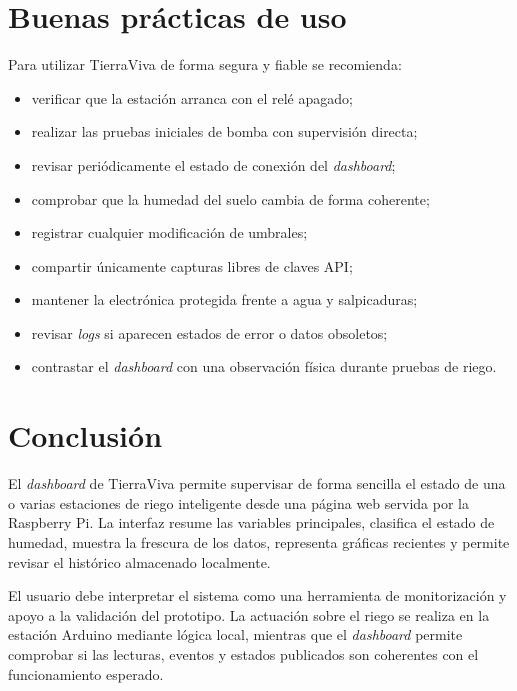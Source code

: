 \section{Buenas prácticas de uso}

Para utilizar TierraViva de forma segura y fiable se recomienda:

\begin{itemize}
    \item verificar que la estación arranca con el relé apagado;
    \item realizar las pruebas iniciales de bomba con supervisión directa;
    \item revisar periódicamente el estado de conexión del \textit{dashboard};
    \item comprobar que la humedad del suelo cambia de forma coherente;
    \item registrar cualquier modificación de umbrales;
    \item compartir únicamente capturas libres de claves API;
    \item mantener la electrónica protegida frente a agua y salpicaduras;
    \item revisar \textit{logs} si aparecen estados de error o datos obsoletos;
    \item contrastar el \textit{dashboard} con una observación física durante pruebas de riego.
\end{itemize}

\section{Conclusión}

El \textit{dashboard} de TierraViva permite supervisar de forma sencilla el estado de una o varias estaciones de riego inteligente desde una página web servida por la Raspberry Pi. La interfaz resume las variables principales, clasifica el estado de humedad, muestra la frescura de los datos, representa gráficas recientes y permite revisar el histórico almacenado localmente.

El usuario debe interpretar el sistema como una herramienta de monitorización y apoyo a la validación del prototipo. La actuación sobre el riego se realiza en la estación Arduino mediante lógica local, mientras que el \textit{dashboard} permite comprobar si las lecturas, eventos y estados publicados son coherentes con el funcionamiento esperado.